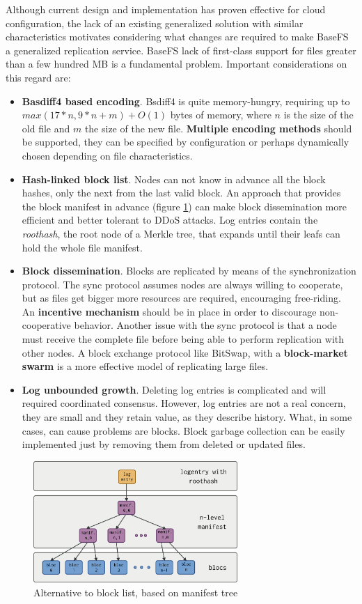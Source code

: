 \documentclass{sig-alternate}
\begin{document}
Although current design and implementation has proven effective for cloud configuration, the lack of an existing generalized solution with similar characteristics motivates considering what changes are required to make BaseFS a generalized replication service. BaseFS lack of first-class support for files greater than a few hundred MB is a fundamental problem. Important considerations on this regard are:  
\begin{itemize}
 \item \textbf{Basdiff4 based encoding}. Bsdiff4 is quite memory-hungry, requiring up to $max(17*n,9*n+m)+O(1)$ bytes of memory, where $n$ is the size of the old file and $m$ the size of the new file. \textbf{Multiple encoding methods} should be supported, they can be specified by configuration or perhaps dynamically chosen depending on file characteristics.
 \item \textbf{Hash-linked block list}. Nodes can not know in advance all the block hashes, only the next from the last valid block. An approach that provides the block manifest in advance (figure \ref{fig:infohash}) can make block dissemination more efficient and better tolerant to DDoS attacks. Log entries contain the \textit{roothash}, the root node of a Merkle tree, that expands until their leafs can hold the whole file manifest.
  \item \textbf{Block dissemination}. Blocks are replicated by means of the synchronization protocol. The sync protocol assumes nodes are always willing to cooperate, but as files get bigger more resources are required, encouraging free-riding. An \textbf{incentive mechanism} should be in place in order to discourage non-cooperative behavior. Another issue with the sync protocol is that a node must receive the complete file before being able to perform replication with other nodes. A block exchange protocol like BitSwap, with a \textbf{block-market swarm} is a more effective model of replicating large files.
  \item \textbf{Log unbounded growth}. Deleting log entries is complicated and will required coordinated consensus\cite{letia2009crdts}. However, log entries are not a real concern, they are small and they retain value, as they describe history. What, in some cases, can cause problems are blocks. Block garbage collection can be easily implemented just by removing them from deleted or updated files.
\end{itemize}

\begin{figure}
\centering
\includegraphics[width=220pt]{imgs/infohash.png}
\caption{Alternative to block list, based on manifest tree}
\label{fig:infohash}
\end{figure}
\end{document}
